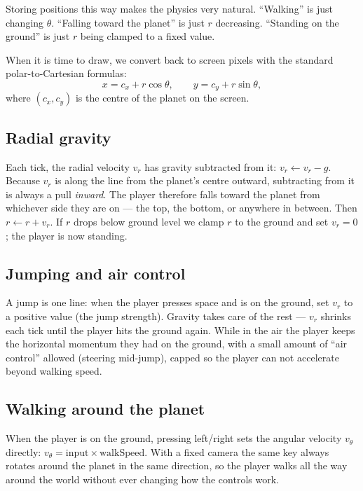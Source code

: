 Storing positions this way makes the physics very natural. ``Walking''
is just changing $\theta$. ``Falling toward the planet'' is just $r$
decreasing. ``Standing on the ground'' is just $r$ being clamped to a
fixed value.

When it is time to draw, we convert back to screen pixels with the
standard polar-to-Cartesian formulas:
\[
x = c_x + r \cos\theta, \qquad y = c_y + r \sin\theta,
\]
where $(c_x, c_y)$ is the centre of the planet on the screen.

\subsection*{Radial gravity}

Each tick, the radial velocity $v_r$ has gravity subtracted from it:
$v_r \leftarrow v_r - g$. Because $v_r$ is along the line from the
planet's centre outward, subtracting from it is always a pull
\emph{inward}. The player therefore falls toward the planet from
whichever side they are on --- the top, the bottom, or anywhere
in between. Then $r \leftarrow r + v_r$. If $r$ drops below
ground level we clamp $r$ to the ground and set $v_r = 0$; the player
is now standing.

\subsection*{Jumping and air control}

A jump is one line: when the player presses space and is on the
ground, set $v_r$ to a positive value (the jump strength). Gravity
takes care of the rest --- $v_r$ shrinks each tick until the player
hits the ground again. While in the air the player keeps the
horizontal momentum they had on the ground, with a small amount of
``air control'' allowed (steering mid-jump), capped so the player can
not accelerate beyond walking speed.

\subsection*{Walking around the planet}

When the player is on the ground, pressing left/right sets the
angular velocity $v_\theta$ directly: $v_\theta = \text{input} \times
\text{walkSpeed}$. With a fixed camera the same key always rotates
around the planet in the same direction, so the player walks all the
way around the world without ever changing how the controls work.

